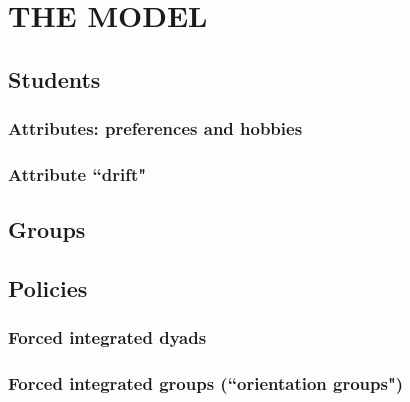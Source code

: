 
\section{THE MODEL}
\label{sec:model}

\subsection{Students}

\subsubsection{Attributes: preferences and hobbies}

\subsubsection{Attribute ``drift"}

\subsection{Groups}

\subsection{Policies}

\subsubsection{Forced integrated dyads}

\subsubsection{Forced integrated groups (``orientation groups")}

